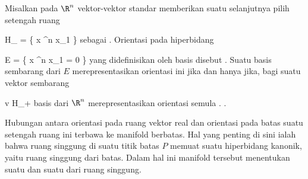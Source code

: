 
Misalkan pada $\R^n$ vektor-vektor standar
 memberikan suatu
selanjutnya pilih setengah ruang

\mavergleichskettedisp
{\vergleichskette
{ H_{}
}
{ =} { \left\{  x \in \R^n   \mid   x_1          \right\}
}
{ } {
}
{ } {
}
{ } {
}
}
{}{}{}
sebagai . Orientasi pada hiperbidang
 {} {}

\mavergleichskettedisp
{\vergleichskette
{ E
}
{ =} { \left\{  x \in \R^n   \mid   x_1 = 0         \right\}
}
{ } {
}
{ } {
}
{ } {
}
}
{}{}{}
yang didefinisikan oleh basis
 disebut  {.} Suatu basis sembarang
 dari $E$ merepresentasikan orientasi ini jika dan hanya jika, bagi suatu vektor sembarang

\mavergleichskette
{\vergleichskette
{ v
}
{ \in }{ H_+
}
{  }{
}
{    }{
}
{   }{
}
}
{}{}{}
 {} {}
basis
 {} {}
dari $\R^n$ merepresentasikan orientasi semula
 {.} {.}

Hubungan antara orientasi pada ruang vektor real dan orientasi pada batas suatu setengah ruang ini terbawa ke manifold berbatas. Hal yang penting di sini ialah bahwa ruang singgung
 di suatu titik batas $P$ memuat suatu hiperbidang kanonik, yaitu ruang singgung
 dari batas. Dalam hal ini manifold tersebut menentukan suatu  dan suatu  dari ruang singgung.

